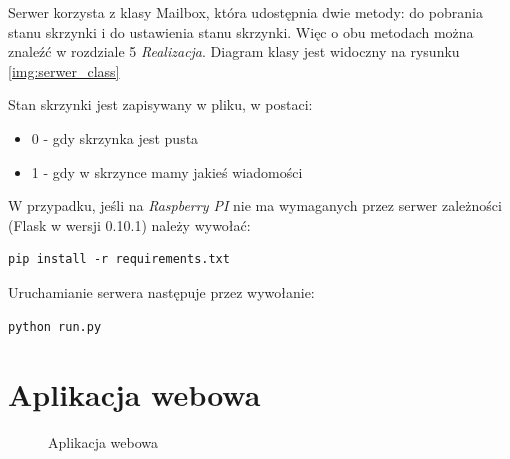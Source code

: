 Serwer korzysta z klasy Mailbox, która udostępnia dwie metody: do pobrania stanu skrzynki i do ustawienia stanu skrzynki. Więc o obu metodach można znaleźć w rozdziale 5 \textit{Realizacja}. Diagram klasy jest widoczny na rysunku \ref{img:serwer_class}

Stan skrzynki jest zapisywany w pliku, w postaci:
\begin{itemize}
\item 0 - gdy skrzynka jest pusta
\item 1 - gdy w skrzynce mamy jakieś wiadomości
\end{itemize}

W przypadku, jeśli na \textit{Raspberry PI} nie ma wymaganych przez serwer zależności (Flask w wersji 0.10.1) należy wywołać:
\begin{lstlisting}
pip install -r requirements.txt
\end{lstlisting}

Uruchamianie serwera następuje przez wywołanie:
\begin{lstlisting}
python run.py
\end{lstlisting}


\section{Aplikacja webowa}


\begin{figure}[H]
	\label{img:skrzynka}
	\caption{Aplikacja webowa}
\end{figure}

